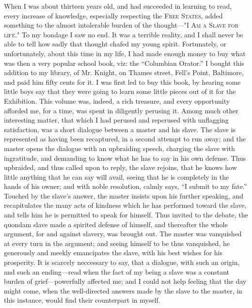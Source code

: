 When I was about thirteen years old, and had succeeded in learning to
read, every increase of knowledge, especially respecting the
\textsc{Free States}, added something to the almost intolerable burden
of the thought---"\textsc{I Am a Slave for life}." To my bondage I saw
no end. It was a terrible reality, and I shall never be able to tell how
sadly that thought chafed my young spirit. Fortunately, or
{\protect\hypertarget{157}{}{}}unfortunately, about this time in my
life, I had made enough money to buy what was then a very popular school
book, viz: the ``Columbian Orator.'' I bought this addition to my
library, of Mr. Knight, on Thames street, Fell's Point, Baltimore, and
paid him fifty cents for it. I was first led to buy this book, by
hearing some little boys say that they were going to learn some little
pieces out of it for the Exhibition. This volume was, indeed, a rich
treasure, and every opportunity afforded me, for a time, was spent in
diligently perusing it. Among much other interesting matter, that which
I had perused and reperused with unflagging satisfaction, was a short
dialogue between a master and his slave. The slave is represented as
having been recaptured, in a second attempt to run away; and the master
opens the dialogue with an upbraiding speech, charging the slave with
ingratitude, and demanding to know what he has to say in his own
defense. Thus upbraided, and thus called upon to reply, the slave
rejoins, that he knows how little anything that he can say will avail,
seeing that he is completely in the hands of his owner; and with noble
resolution, calmly says, ``I submit to my fate.'' Touched by the slave's
answer, the master insists upon his further speaking, and recapitulates
the many acts of kindness which he has performed toward the slave, and
tells him he is permitted to speak for himself. Thus invited to the
debate, the quondam slave made a spirited defense of himself, and
thereafter the whole argument, for and against slavery, was brought out.
The master was vanquished at every turn in the argument; and seeing
himself to be thus vanquished, he
{\protect\hypertarget{158}{}{}}generously and meekly emancipates the
slave, with his best wishes for his prosperity. It is scarcely
neccessary to say, that a dialogue, with such an origin, and such an
ending---read when the fact of my being a slave was a constant burden of
grief---powerfully affected me; and I could not help feeling that the
day might come, when the well-directed answers made by the slave to the
master, in this instance, would find their counterpart in myself.

